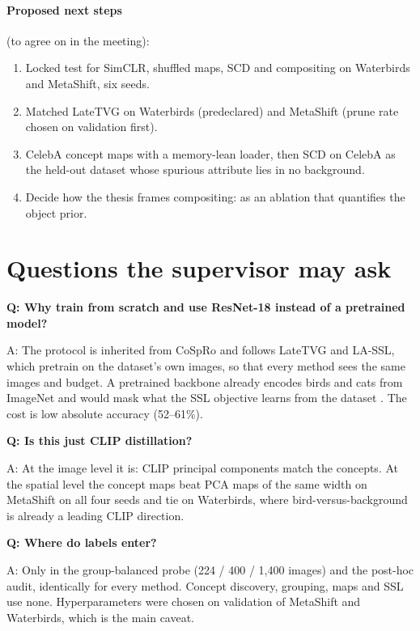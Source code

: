 \documentclass[11pt]{article}
\begin{document}
\paragraph{Proposed next steps} (to agree on in the meeting):
\begin{enumerate}[leftmargin=*]
\item Locked test for SimCLR, shuffled maps, SCD and compositing on Waterbirds and MetaShift, six seeds.
\item Matched LateTVG on Waterbirds (predeclared) and MetaShift (prune rate chosen on validation first).
\item CelebA concept maps with a memory-lean loader, then SCD on CelebA as the held-out dataset whose spurious
attribute lies in no background.
\item Decide how the thesis frames compositing: as an ablation that quantifies the object prior.
\end{enumerate}

\section{Questions the supervisor may ask}
\newcommand{\qa}[2]{\par\textbf{Q: #1}\par\nopagebreak A: #2\par\smallskip}

\qa{Why train from scratch and use ResNet-18 instead of a pretrained model?}{The protocol is inherited from CoSpRo and
follows LateTVG and LA-SSL, which pretrain on the dataset's own images, so that every method sees the same images and
budget. A pretrained backbone already encodes birds and cats from ImageNet and would mask what the SSL objective learns
from the dataset \citep{izmailov2022feature}. The cost is low absolute accuracy (52--61\%).}

\qa{Is this just CLIP distillation?}{At the image level it is: CLIP principal components match the concepts. At the
spatial level the concept maps beat PCA maps of the same width on MetaShift on all four seeds and tie on Waterbirds,
where bird-versus-background is already a leading CLIP direction.}

\qa{Where do labels enter?}{Only in the group-balanced probe (224 / 400 / 1,400 images) and the post-hoc audit,
identically for every method. Concept discovery, grouping, maps and SSL use none. Hyperparameters were chosen on
validation of MetaShift and Waterbirds, which is the main caveat.}
\end{document}
